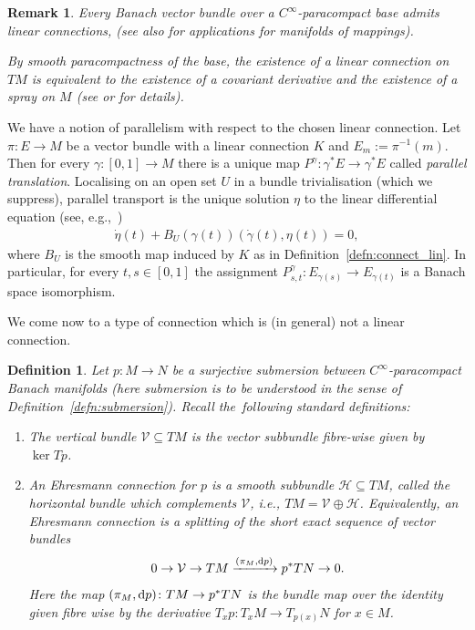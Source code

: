 \documentclass[pdftex]{sigma}
\numberwithin{equation}{section}
\newtheorem{Definition}[Theorem]{Definition}
\newtheorem{setup}[Theorem]{}
\newtheorem{Remark}[Theorem]{Remark} }
\newcommand{\cV}{\ensuremath{\mathcal{V}}}
\begin{document}
\begin{Remark}\label{rem:ex_lincon}
Every Banach vector bundle over a $C^\infty$-paracompact base admits linear connections, \cite[Theorem 1.5.15]{Kli95} (see also \cite{Eli67} for applications for manifolds of mappings).

By smooth paracompactness of the base, the existence of a linear connection on $TM$ is equivalent to the existence of a covariant derivative and the existence of a spray on $M$ (see \mbox{\cite[Section VIII]{La01}} or \cite[Section 1.5]{Kli95} for details).
\end{Remark}

We have a notion of parallelism with respect to the chosen linear connection.
\label{setup:parallel_tp}
Let $\pi \colon E \rightarrow M$ be a vector bundle with a linear connection $K$ and $E_m := \pi^{-1}(m)$.
Then for every $\gamma \colon [0,1] \rightarrow M$ there is a unique map $P^\gamma\colon \gamma^\ast E \rightarrow \gamma^\ast E$ called \emph{parallel translation}.
Localising on an open set $U$ in a bundle trivialisation (which we suppress), parallel transport is the unique solution $\eta$ to the linear differential equation (see, e.g.,~\mbox{\cite[Lemma~1.6.14]{Kli95}})
\begin{align}\label{eq:PT_diffeo}
\dot{\eta}(t) + B_U (\gamma(t)) (\dot{\gamma}(t),\eta(t))=0,
\end{align}
where $B_U$ is the smooth map induced by $K$ as in Definition~\ref{defn:connect_lin}.
In particular, for every $t,s \in [0,1]$ the assignment
$P_{s,t}^\gamma \colon E_{\gamma (s)} \rightarrow E_{\gamma (t)}$
is a Banach space isomorphism.

We come now to a type of connection which is (in general) not a linear connection.

\begin{Definition}
Let $p \colon M \rightarrow N$ be a surjective submersion between $C^\infty$-paracompact Banach manifolds (here submersion is to be understood in the sense of Definition~\ref{defn:submersion}). Recall the~following standard definitions:
\begin{enumerate}\itemsep=0pt
\item The \emph{vertical bundle} $\mathcal{V} \subseteq TM$ is the vector subbundle fibre-wise given by $\ker T p$.
\item An \emph{Ehresmann connection} for $p$ is a smooth subbundle $\mathcal{H} \subseteq TM$, called the \emph{horizontal bundle} which complements $\cV$, i.e., $TM=\mathcal{V} \oplus \mathcal{H}$.
Equivalently, an Ehresmann connection is a splitting of the short exact sequence of vector bundles
\begin{displaymath}0 \rightarrow \cV \rightarrow TM \xrightarrow{(\pi_M,{\rm d}p)} p^{\ast}TN \rightarrow 0.\end{displaymath}
Here the map $(\pi_M,{\rm d}p) \colon TM \rightarrow p^\ast TN$ is the bundle map over the identity given fibre wise by the derivative $T_xp \colon T_x M \rightarrow T_{p(x)}N$ for $x\in M$.
\end{enumerate}
\end{Definition}
\end{document}
